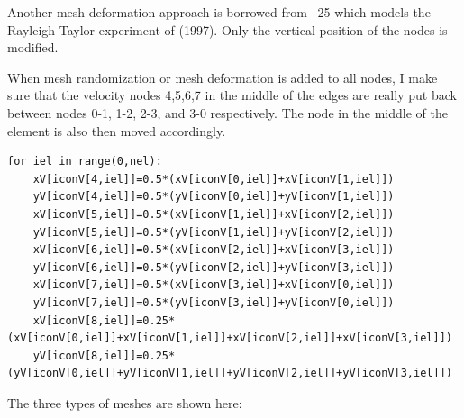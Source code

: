 Another mesh deformation approach is borrowed from \stone~25 which models the 
Rayleigh-Taylor experiment of \textcite{vaks97} (1997). Only the vertical position 
of the nodes is modified.


When mesh randomization or mesh deformation is added to all nodes, 
I make sure that the velocity nodes 4,5,6,7 in the middle of the edges 
are really put back between nodes 0-1, 1-2, 2-3, and 3-0 respectively. 
The node in the middle of the element is also then moved accordingly.
\begin{lstlisting}
for iel in range(0,nel):
    xV[iconV[4,iel]]=0.5*(xV[iconV[0,iel]]+xV[iconV[1,iel]])
    yV[iconV[4,iel]]=0.5*(yV[iconV[0,iel]]+yV[iconV[1,iel]])
    xV[iconV[5,iel]]=0.5*(xV[iconV[1,iel]]+xV[iconV[2,iel]])
    yV[iconV[5,iel]]=0.5*(yV[iconV[1,iel]]+yV[iconV[2,iel]])
    xV[iconV[6,iel]]=0.5*(xV[iconV[2,iel]]+xV[iconV[3,iel]])
    yV[iconV[6,iel]]=0.5*(yV[iconV[2,iel]]+yV[iconV[3,iel]])
    xV[iconV[7,iel]]=0.5*(xV[iconV[3,iel]]+xV[iconV[0,iel]])
    yV[iconV[7,iel]]=0.5*(yV[iconV[3,iel]]+yV[iconV[0,iel]])
    xV[iconV[8,iel]]=0.25*(xV[iconV[0,iel]]+xV[iconV[1,iel]]+xV[iconV[2,iel]]+xV[iconV[3,iel]])
    yV[iconV[8,iel]]=0.25*(yV[iconV[0,iel]]+yV[iconV[1,iel]]+yV[iconV[2,iel]]+yV[iconV[3,iel]])
\end{lstlisting}

The three types of meshes are shown here:

